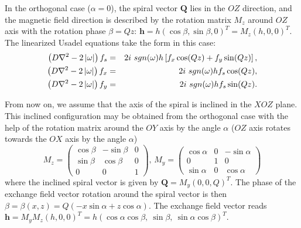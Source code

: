 \documentclass[prb,amsmath,amssymb,reprint]{revtex4-2}
\begin{document}
 In the orthogonal case ($\alpha =0$), the
spiral vector $\mathbf{Q}$ lies in the $OZ$ direction, and the
magnetic field direction is described by the rotation matrix $M_{z}$ around $%
OZ$ axis with the rotation phase $\beta =Qz$: $\mathbf{{h}=}h(\cos \beta
,\sin \beta ,0)^{T}=M_{z}\left( h,0,0\right) ^{T}\mathbf{.}$ The linearized
Usadel equations take the form in this case:
\begin{eqnarray}
\left( D\nabla ^{2}-2\left\vert \omega \right\vert \right) f_{s} &=&2i\
sgn(\omega )h\left[ f_{x}\cos (Qz)+f_{y}\sin (Qz)\right] ,  \notag \\
\left( D\nabla ^{2}-2\left\vert \omega \right\vert \right) f_{x} &=&2i\
sgn(\omega )hf_{s}\cos (Qz),  \label{UU:1} \\
\left( D\nabla ^{2}-2\left\vert \omega \right\vert \right) f_{y} &=&2i\
sgn(\omega )hf_{s}\sin ( Qz).  \notag
\end{eqnarray}

From now on, we assume that the axis of the spiral is inclined in the $XOZ$ plane. This inclined
configuration may be obtained from the orthogonal case with the help of
the rotation matrix around the $OY$ axis by the angle $\alpha $ ($OZ$ axis
rotates towards the $OX$ axis by the angle $\alpha $)
\begin{equation}
M_{z}=\left(
\begin{array}{ccc}
\cos \beta & -\sin \beta & 0 \\
\sin \beta & \cos \beta & 0 \\
0 & 0 & 1
\end{array}
\right) , \,  M_{y}=\left(
\begin{array}{ccc}
\cos \alpha & 0 & -\sin \alpha \\
0 & 1 & 0 \\
\sin \alpha & 0 & \cos \alpha
\end{array}
\right)  \label{MzMy}
\end{equation}
where the inclined spiral vector is given by $\mathbf{{Q}=}M_{y} (0,0,Q)^{T}$.
The phase of the exchange field vector rotation around the spiral vector
is then $\beta =\beta (x,z)=Q\left( -x\sin \alpha +z\cos \alpha \right)$. The
exchange field vector reads $\mathbf{{h}=}M_{y}M_{z}\left( h,0,0\right)
^{T}=h(\cos \alpha \cos \beta ,~\sin \beta ,~\sin \alpha \cos \beta )^{T}%
\mathbf{.}$
\end{document}
